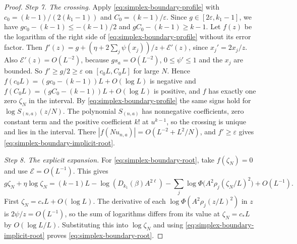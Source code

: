 \begin{proof}
\emph{Step 7. The crossing.} Apply \eqref{eq:simplex-boundary-profile} with
$c_0=(k-1)/(2(k_1-1))$ and $C_0=(k-1)/\varepsilon$. Since
$g\in[2\varepsilon,k_1-1]$, we have $gc_0-(k-1)\le-(k-1)/2$ and
$gC_0-(k-1)\ge k-1$. Let $f(z)$ be the logarithm of
the right side of \eqref{eq:simplex-boundary-profile} without its error
factor. Then $f'(z)=g+(\eta+2\sum_j\psi(x_j))/z+\mathcal E'(z)$, since
$x_j'=2x_j/z$. Also $\mathcal E'(z)=O(L^{-2})$, because $gs_a=O(L^{-2})$,
$0\le\psi'\le1$ and the $x_j$ are bounded. So $f'\ge g/2\ge\varepsilon$
on $[c_0L,C_0L]$ for large $N$. Hence $f(c_0L)=(gc_0-(k-1))L+O(\log L)$ is
negative and $f(C_0L)=(gC_0-(k-1))L+O(\log L)$ is positive, and $f$ has exactly
one zero $\zeta_N$ in the interval. By \eqref{eq:simplex-boundary-profile} the
same signs hold for $\log S_{(n,a)}(z/N)$. The polynomial $S_{(n,a)}$ has
nonnegative coefficients, zero constant term and the positive coefficient
$k!$ at $u^{k-1}$, so the crossing is unique and lies in the interval. There
$|f(Nu_{n,a})|=O(L^{-2}+L^2/N)$, and $f'\ge\varepsilon$ gives
\eqref{eq:simplex-boundary-implicit-root}.

\emph{Step 8. The explicit expansion.} For \eqref{eq:simplex-boundary-root},
take $f(\zeta_N)=0$ and use $\mathcal E=O(L^{-1})$. This gives
\[
g\zeta_N+\eta\log\zeta_N=(k-1)L-\log(D_{k_1}(\beta)A^{2\ell})
-\sum_j\log\Phi\bigl(A^2\rho_j(\zeta_N/L)^2\bigr)+O(L^{-1}).
\]
First $\zeta_N=c_*L+O(\log L)$. The derivative of each
$\log\Phi(A^2\rho_j(z/L)^2)$ in $z$ is $2\psi/z=O(L^{-1})$, so the sum of
logarithms differs from its value at $\zeta_N=c_*L$ by $O(\log L/L)$.
Substituting this into $\log\zeta_N$ and using
\eqref{eq:simplex-boundary-implicit-root} proves
\eqref{eq:simplex-boundary-root}.
\end{proof}

